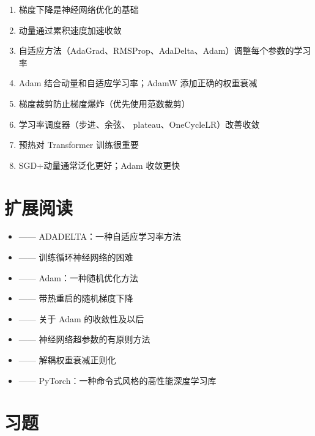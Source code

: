 \begin{enumerate}
    \item 梯度下降是神经网络优化的基础
    \item 动量通过累积速度加速收敛
    \item 自适应方法（AdaGrad、RMSProp、AdaDelta、Adam）调整每个参数的学习率
    \item Adam 结合动量和自适应学习率；AdamW 添加正确的权重衰减
    \item 梯度裁剪防止梯度爆炸（优先使用范数裁剪）
    \item 学习率调度器（步进、余弦、 plateau、OneCycleLR）改善收敛
    \item 预热对 Transformer 训练很重要
    \item SGD+动量通常泛化更好；Adam 收敛更快
\end{enumerate}

\section{扩展阅读}

\begin{itemize}
    \item \cite{zeiler2012adadelta} —— ADADELTA：一种自适应学习率方法
    \item \cite{pascanu2013difficulty} —— 训练循环神经网络的困难
    \item \cite{kingma2014adam} —— Adam：一种随机优化方法
    \item \cite{loshchilov2016sgdr} —— 带热重启的随机梯度下降
    \item \cite{reddi2018convergence} —— 关于 Adam 的收敛性及以后
    \item \cite{smith2018disciplined} —— 神经网络超参数的有原则方法
    \item \cite{loshchilov2019decoupled} —— 解耦权重衰减正则化
    \item \cite{paszke2019pytorch} —— PyTorch：一种命令式风格的高性能深度学习库
\end{itemize}

\section{习题}

